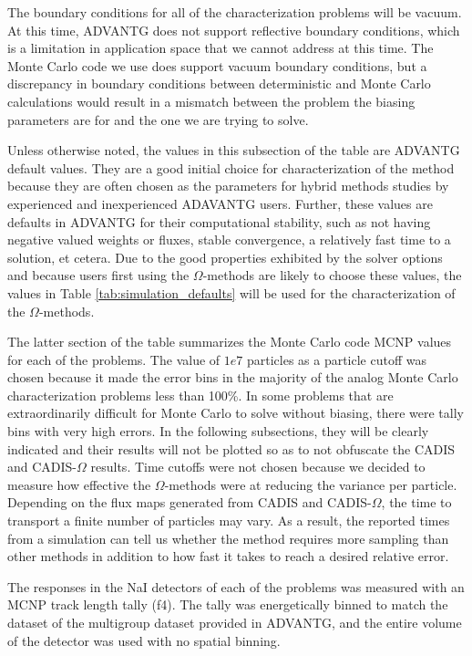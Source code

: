 The boundary conditions for all of the characterization problems will be vacuum.
At this time, ADVANTG does not support reflective boundary conditions,
which is a limitation in application space that we cannot address at this
time. The Monte Carlo code we use does support vacuum boundary conditions, but a
discrepancy in boundary conditions between deterministic and Monte Carlo
calculations would result in a mismatch between the problem the biasing parameters
are for and the one we are trying to solve. 

Unless otherwise noted, the values in this subsection of the table are ADVANTG
default values. They are a good initial choice for characterization of the
method because they are often chosen as the parameters for hybrid methods studies
by experienced and inexperienced ADAVANTG users.
Further, these values are defaults in ADVANTG for their
computational stability, such as not having negative valued weights or fluxes,
stable convergence, a relatively fast time to a solution, et cetera. Due to
the good properties exhibited by the solver options and because users first
using the $\Omega$-methods are likely to choose these values, the values in
Table \ref{tab:simulation_defaults} will be used for the characterization of the
$\Omega$-methods.

The latter section of the table summarizes the Monte Carlo code MCNP values for
each of the problems. The value of $1e7$ particles as a particle cutoff
was chosen because it made the
error bins in the majority of the analog Monte Carlo
characterization problems less than 100\%. In some problems that are
extraordinarily difficult for Monte Carlo to solve without biasing, there were
tally bins with very high errors. In the following subsections, they will be
clearly indicated and their results will not be plotted so as to not obfuscate
the CADIS and CADIS-$\Omega$ results. Time cutoffs were not chosen because
we decided to measure how effective the $\Omega$-methods were at reducing the
variance per particle. Depending on the flux maps generated from CADIS and
CADIS-$\Omega$, the time to transport a finite number of particles may vary. As
a result, the reported times from a simulation can tell us whether the method
requires more sampling than other methods in addition to how fast it takes to
reach a desired relative error.

The responses in the NaI detectors of each of
the problems was measured with an MCNP track length tally (f4). The tally was
energetically binned to match the dataset of the multigroup dataset provided in
ADVANTG, and the entire volume of the detector was used with no spatial
binning. 

